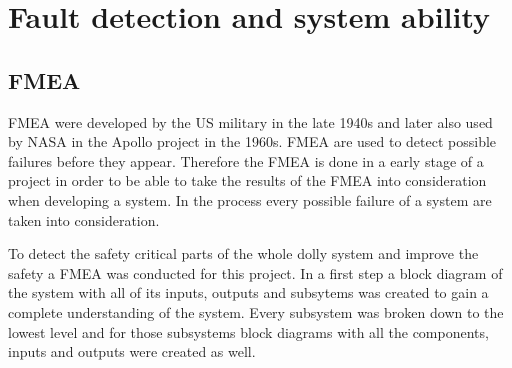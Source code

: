\documentclass[ExampleMasters.tex]{subfiles}
\begin{document}
\clearpage
{\pagestyle{empty}\cleardoublepage}%

\chapter{Fault detection and system ability}
\label{chap:fault_detection}
\section{\acrlong{FMEA}}
\label{sec:FMEA}
\acrfull{FMEA} were developed by the US military in the late 1940s and later also used by NASA in the Apollo project in the 1960s.
\gls{FMEA} are used to detect possible failures before they appear. Therefore the \gls{FMEA} is done in a early stage of a project in order to be able to take the results of the \gls{FMEA} into consideration when developing a system. In the process every possible failure of a system are taken into consideration. 

To detect the safety critical parts of the whole dolly system and improve the safety a \gls{FMEA} was conducted for this project.
In a first step a block diagram of the system with all of its inputs, outputs and subsytems was created to gain a complete understanding of the system. Every subsystem was broken down to the lowest level and for those subsystems block diagrams with all the components, inputs and outputs were created as well.
\end{document}
